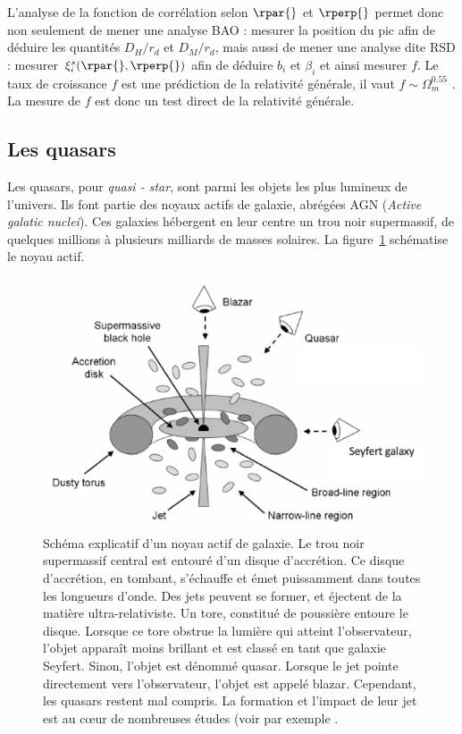 L'analyse de la fonction de corrélation selon $\rpar{}$ et $\rperp{}$ permet donc non seulement de mener une analyse BAO : mesurer la position du pic afin de déduire les quantités $D_{H} / r_d$ et $D_{M} / r_d$, mais aussi de mener une analyse dite RSD : mesurer $\xi_i^s(\rpar{}, \rperp{})$ afin de déduire $b_i$ et $\beta_i$ et ainsi mesurer $f$. Le taux de croissance $f$ est une prédiction de la relativité générale, il vaut $f \sim \Omega_{m}^{\num{0.55}}$ \autocite{Linder2007}. La mesure de $f$ est donc un test direct de la relativité générale.

\subsection{Les quasars}
Les quasars, pour \emph{quasi - star}, sont parmi les objets les plus lumineux de l'univers. Ils font partie des noyaux actifs de galaxie, abrégées AGN (\emph{Active galatic nuclei}). Ces galaxies hébergent en leur centre un trou noir supermassif, de quelques millions à plusieurs milliards de masses solaires. La figure~\ref{fig:schema_qso} schématise le noyau actif. 
\begin{figure}
  \centering
  \includegraphics[scale=0.68]{schema_qso2}
  \caption{Schéma explicatif d'un noyau actif de galaxie. Le trou noir supermassif central est entouré d'un disque d'accrétion. Ce disque d'accrétion, en tombant, s'échauffe et émet puissamment dans toutes les longueurs d'onde. Des jets peuvent se former, et éjectent de la matière ultra-relativiste. Un tore, constitué de poussière entoure le disque. Lorsque ce tore obstrue la lumière qui atteint l'observateur, l'objet apparaît moins brillant et est classé en tant que galaxie Seyfert.  Sinon, l'objet est dénommé quasar. Lorsque le jet pointe directement vers l'observateur, l'objet est appelé blazar.
  Cependant, les quasars restent mal compris. La formation et l'impact de leur jet est au c{\oe}ur de nombreuses études (voir par exemple \textcite{Chabanier2020}.}
  \label{fig:schema_qso}
\end{figure}
